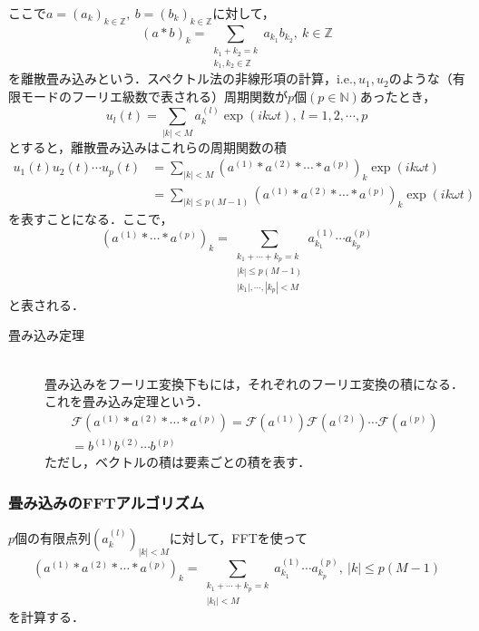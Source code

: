 \documentclass[11pt,a4paper]{jsarticle}
\theoremstyle{definition}
\begin{document}
ここで$a=(a_k)_{k\in\mathbb{Z}},\ b=(b_k)_{k\in\mathbb{Z}}$に対して，
\begin{equation*}
  (a * b)_k = \sum_{\substack{{k_1+k_2=k} \\ {k_1,k_2\in\mathbb{Z}}}} a_{k_1}b_{k_2},\ k\in\mathbb{Z}
\end{equation*}
を離散畳み込みという．スペクトル法の非線形項の計算，$\mathrm{i.e.},u_1,u_2$のような（有限モードのフーリエ級数で表される）周期関数が$p個(p\in\mathbb{N})$あったとき，
\begin{equation*}
  u_l(t) = \sum_{|k|<M} a_k^{(l)} \exp(ik\omega t),\ l=1,2,\cdots,p
\end{equation*}
とすると，離散畳み込みはこれらの周期関数の積
\begin{align*}
  u_1(t)u_2(t)\cdots u_p(t) & = \sum_{|k|<M} \left(a^{(1)} * a^{(2)} * \cdots * a^{(p)}\right)_k \exp(ik\omega t)          \\
                            & = \sum_{|k|\leq p(M-1)} \left(a^{(1)} * a^{(2)} * \cdots * a^{(p)}\right)_k \exp(ik\omega t)
\end{align*}
を表すことになる．ここで，
\begin{equation*}
  \left( a^{(1)} * \cdots * a^{(p)} \right)_k = \sum_{\substack{{k_1+\cdots+k_p=k} \\ {|k| \leq p(M-1)} \\ {|k_1|,\cdots,|k_p|<M}}} a_{k_1}^{(1)}\cdots a_{k_p}^{(p)}
\end{equation*}
と表される．

\begin{description}
  \item[畳み込み定理]
    \quad \\
    畳み込みをフーリエ変換下もには，それぞれのフーリエ変換の積になる．これを畳み込み定理という．
    \begin{align*}
      \mathcal{F} \left( a^{(1)} * a^{(2)} * \cdots * a^{(p)} \right)= \mathcal{F} \left( a^{(1)} \right) \mathcal{F} \left( a^{(2)} \right) \cdots \mathcal{F} \left( a^{(p)} \right) \\
      = b^{(1)}b^{(2)}\cdots b^{(p)}
    \end{align*}
    ただし，ベクトルの積は要素ごとの積を表す．
\end{description}


\subsubsection{畳み込みのFFTアルゴリズム}
$p$個の有限点列$\left(a_{k}^{(l)}\right)_{|k|<M}$に対して，FFTを使って
\begin{equation*}
  \left(a^{(1)} * a^{(2)} * \cdots * a^{(p)}\right)_k = \sum_{\substack{{k_1+\cdots+k_p=k} \\ {|k_l|<M}}} a_{k_1}^{(1)}\cdots a_{k_p}^{(p)},\ |k| \leq p(M-1)
\end{equation*}
を計算する．
\end{document}
